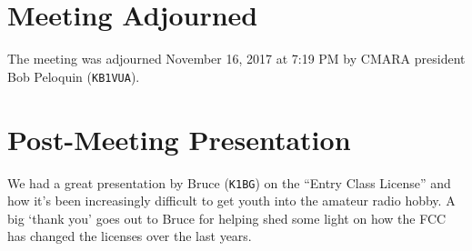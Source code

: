 \documentclass[10pt,letterpaper]{article}
\begin{document}
\section{Meeting Adjourned}
The meeting was adjourned November 16, 2017 at 7:19 PM by CMARA president Bob Peloquin (\texttt{KB1VUA}).

\section{Post-Meeting Presentation}
We had a great presentation by Bruce (\texttt{K1BG}) on the ``Entry Class License'' and how it's been increasingly difficult to get youth into the amateur radio hobby. A big `thank you' goes out to Bruce for helping shed some light on how the FCC has changed the licenses over the last years.
\end{document}
